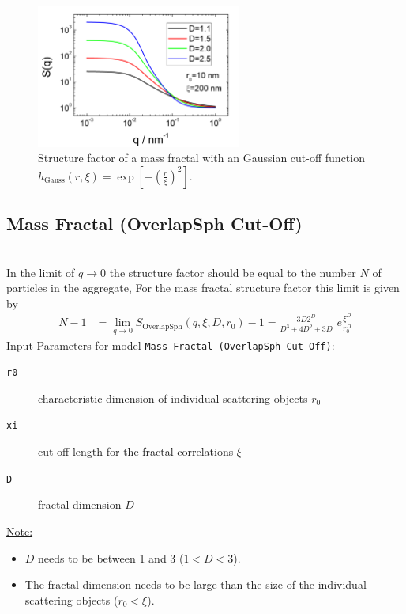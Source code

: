 \begin{figure}[htb]
\begin{center}
\includegraphics[width=0.6\textwidth]{../images/structure_factor/MassFractals/SQGaussCutOff.png}
\end{center}
\caption{Structure factor of a mass fractal with an Gaussian
cut-off function $h_\text{Gauss}(r,\xi) = \exp\left[-\left(\tfrac{r}{\xi}\right)^2\right]$.}
\label{fig:SQGaussCutOff}
\end{figure}


\clearpage
\subsection{Mass Fractal (OverlapSph Cut-Off)}
~\\
In the limit of $q \to 0$ the structure factor should be equal to the number $N$ of particles in the aggregate, For the mass fractal structure factor this limit is given by
\begin{align}\label{eq:fractalGauss}
  N-1 & =\lim_{q\to 0}  S_\text{OverlapSph}(q,\xi,D,r_0)-1 = \frac{3D 2^D}{D^3+4D^2+3D} \,\, e\frac{\xi^D}{r_0^D}
\end{align}
\underline{Input Parameters for model \texttt{Mass Fractal (OverlapSph Cut-Off)}:}
\begin{description}
\item[\texttt{r0}] characteristic dimension of individual scattering objects $r_0$
\item[\texttt{xi}] cut-off length for the fractal correlations $\xi$
\item[\texttt{D}] fractal dimension $D$
\end{description}

\underline{Note:}
\begin{itemize}
\item $D$ needs to be between 1 and 3 ($1<D<3$).
\item The fractal dimension needs to be large than the size of the individual scattering objects ($r_0 < \xi$).
\end{itemize}

